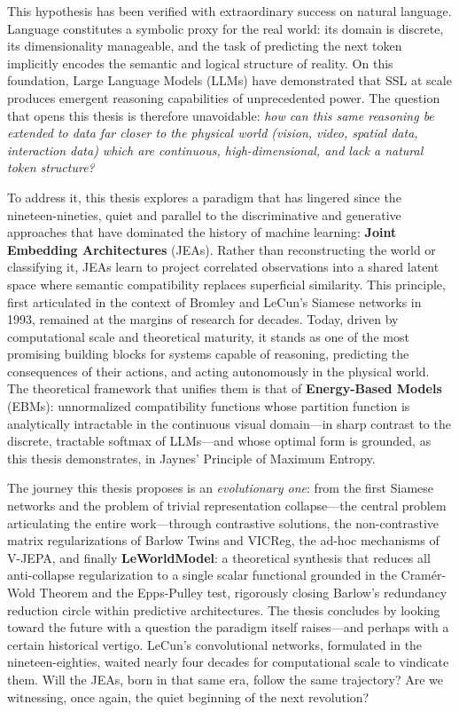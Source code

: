 \documentclass[11pt, oneside, openany]{book}
\begin{document}
This hypothesis has been verified with extraordinary success on natural language. Language constitutes a symbolic proxy for the real world: its domain is discrete, its dimensionality manageable, and the task of predicting the next token implicitly encodes the semantic and logical structure of reality. On this foundation, Large Language Models (LLMs) have demonstrated that SSL at scale produces emergent reasoning capabilities of unprecedented power. The question that opens this thesis is therefore unavoidable: \textit{how can this same reasoning be extended to data far closer to the physical world (vision, video, spatial data, interaction data) which are continuous, high-dimensional, and lack a natural token structure?}

To address it, this thesis explores a paradigm that has lingered since the nineteen-nineties, quiet and parallel to the discriminative and generative approaches that have dominated the history of machine learning: \textbf{Joint Embedding Architectures} (JEAs). Rather than reconstructing the world or classifying it, JEAs learn to project correlated observations into a shared latent space where semantic compatibility replaces superficial similarity. This principle, first articulated in the context of Bromley and LeCun's Siamese networks in 1993, remained at the margins of research for decades. Today, driven by computational scale and theoretical maturity, it stands as one of the most promising building blocks for systems capable of reasoning, predicting the consequences of their actions, and acting autonomously in the physical world. The theoretical framework that unifies them is that of \textbf{Energy-Based Models} (EBMs): unnormalized compatibility functions whose partition function is analytically intractable in the continuous visual domain---in sharp contrast to the discrete, tractable softmax of LLMs---and whose optimal form is grounded, as this thesis demonstrates, in Jaynes' Principle of Maximum Entropy.

The journey this thesis proposes is an \textit{evolutionary one}: from the first Siamese networks and the problem of trivial representation collapse---the central problem articulating the entire work---through contrastive solutions, the non-contrastive matrix regularizations of Barlow Twins and VICReg, the ad-hoc mechanisms of V-JEPA, and finally \textbf{LeWorldModel}: a theoretical synthesis that reduces all anti-collapse regularization to a single scalar functional grounded in the Cram\'er-Wold Theorem and the Epps-Pulley test, rigorously closing Barlow's redundancy reduction circle within predictive architectures. The thesis concludes by looking toward the future with a question the paradigm itself raises---and perhaps with a certain historical vertigo. LeCun's convolutional networks, formulated in the nineteen-eighties, waited nearly four decades for computational scale to vindicate them. Will the JEAs, born in that same era, follow the same trajectory? Are we witnessing, once again, the quiet beginning of the next revolution?
\end{document}
